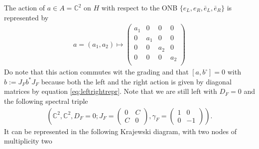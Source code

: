 The action of $a \in A = \mathbb{C}^2$ on $H$ with respect to the ONB
$\{e_L, e_R, \bar{e}_L, \bar{e}_R\}$ is represented by
\begin{align}\label{eq:leftrightrepr}
    a =
    (a_1 , a_2 ) \mapsto
        \begin{pmatrix}
            a_1 &0 &0 &0\\
             0&a_1 &0 &0\\
            0 &0 &a_2 &0\\
            0 &0 &0 &a_2\\
        \end{pmatrix}
\end{align}
Do note that this action commutes wit the grading and that
$[a, b^\circ] = 0$ with $b:= J_F b^*J_F$ because both the left and the right
action is given by diagonal matrices by equation \eqref{eq:leftrightrepr}. Note
that we are still left with $D_F = 0$ and the following spectral
triple
\begin{align}\label{eq:fedfail}
        \left( \mathbb{C}^2, \mathbb{C}^2, D_F=0; J_F =
        \begin{pmatrix}
            0 & C \\ C &0
        \end{pmatrix},
        \gamma _F =
        \begin{pmatrix}
            1 & 0 \\ 0 &-1
        \end{pmatrix}
        \right).
    \end{align}
It can be represented in the following Krajewski diagram,
with two nodes of multiplicity two
    \begin{figure}[H] \centering
    \end{figure}
